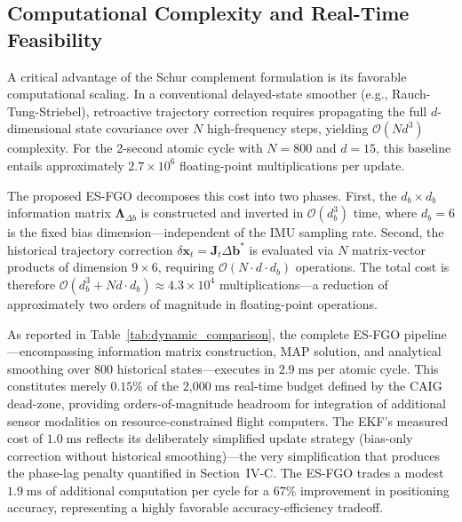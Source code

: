 \documentclass[journal]{IEEEtran}
\begin{document}
	\subsection{Computational Complexity and Real-Time Feasibility}
	A critical advantage of the Schur complement formulation is its favorable computational scaling. In a conventional delayed-state smoother (e.g., Rauch-Tung-Striebel), retroactive trajectory correction requires propagating the full $d$-dimensional state covariance over $N$ high-frequency steps, yielding $\mathcal{O}(N d^3)$ complexity. For the 2-second atomic cycle with $N = 800$ and $d = 15$, this baseline entails approximately $2.7 \times 10^6$ floating-point multiplications per update.
	
	The proposed ES-FGO decomposes this cost into two phases. First, the $d_b \times d_b$ information matrix $\bm{\Lambda}_{\Delta b}$ is constructed and inverted in $\mathcal{O}(d_b^3)$ time, where $d_b = 6$ is the fixed bias dimension---independent of the IMU sampling rate. Second, the historical trajectory correction $\delta \bm{x}_t = \bm{J}_t \Delta \bm{b}^*$ is evaluated via $N$ matrix-vector products of dimension $9 \times 6$, requiring $\mathcal{O}(N \cdot d \cdot d_b)$ operations. The total cost is therefore $\mathcal{O}(d_b^3 + N d \cdot d_b) \approx 4.3 \times 10^4$ multiplications---a reduction of approximately two orders of magnitude in floating-point operations.
	
	As reported in Table~\ref{tab:dynamic_comparison}, the complete ES-FGO pipeline---encompassing information matrix construction, MAP solution, and analytical smoothing over 800 historical states---executes in $2.9\;\text{ms}$ per atomic cycle. This constitutes merely $\mathbf{0.15\%}$ of the $2\text{,}000\;\text{ms}$ real-time budget defined by the CAIG dead-zone, providing orders-of-magnitude headroom for integration of additional sensor modalities on resource-constrained flight computers. The EKF's measured cost of $1.0\;\text{ms}$ reflects its deliberately simplified update strategy (bias-only correction without historical smoothing)---the very simplification that produces the phase-lag penalty quantified in Section~IV-C. The ES-FGO trades a modest $1.9\;\text{ms}$ of additional computation per cycle for a $67\%$ improvement in positioning accuracy, representing a highly favorable accuracy-efficiency tradeoff.
	
\end{document}
